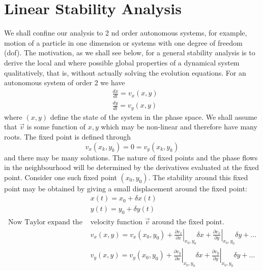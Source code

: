 \section{Linear Stability Analysis}
We shall confine our analysis to 2 nd order autonomous systems, for example, motion of a particle in one dimension or systems with one degree of freedom (dof). The motivation, as we shall see below, for a general stability analysis is to derive the local and where possible global properties of a dynamical system qualitatively, that is, without actually solving the evolution equations.
For an autonomous system of order 2 we have\\
$$\begin{aligned}
	&\frac{d x}{d t}=v_{x}(x, y) \\
	&\frac{d y}{d t}=v_{y}(x, y)
\end{aligned}$$
where $(x, y)$ define the state of the system in the phase space. We shall assume that $\vec{v}$ is some function of $x, y$ which may be non-linear and therefore have many roots. The fixed point is defined through
$$
v_{x}\left(x_{k}, y_{k}\right)=0=v_{y}\left(x_{k}, y_{k}\right)
$$
and there may be many solutions. The nature of fixed points and the phase flows in the neighbourhood will be determined by the derivatives evaluated at the fixed point.
Consider one such fixed point $\left(x_{0}, y_{0}\right)$. The stability around this fixed point may be obtained by giving a small displacement around the fixed point:
$$
\begin{aligned}
&x(t)=x_{0}+\delta x(t) \\
&y(t)=y_{0}+\delta y(t)\\
\text{Now Taylor expand the }&\text{velocity function $\vec{v}$ around the fixed point.}\\
&v_{x}(x, y)=v_{x}\left(x_{0}, y_{0}\right)+\left.\frac{\partial v_{x}}{\partial x}\right|_{x_{0}, y_{0}} \delta x+\left.\frac{\partial v_{x}}{\partial y}\right|_{x_{0}, y_{0}} \delta y+\ldots \\
&v_{y}(x, y)=v_{y}\left(x_{0}, y_{0}\right)+\left.\frac{\partial v_{y}}{\partial x}\right|_{x_{0}, y_{0}} \delta x+\left.\frac{\partial v_{y}}{\partial y}\right|_{x_{0}, y_{0}} \delta y+\ldots
\end{aligned}
$$
